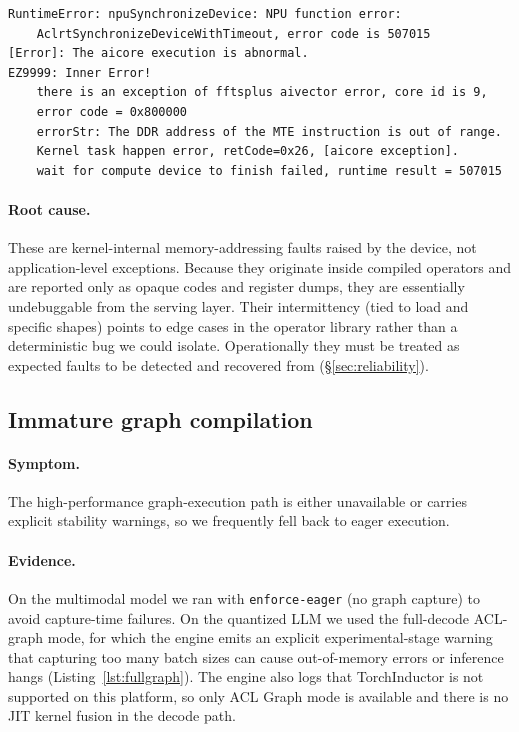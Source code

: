 \documentclass{article}
\newcommand{\code}[1]{\texttt{#1}}
\begin{document}
\begin{lstlisting}[caption={Aicore execution fault (runtime result 507015).},label={lst:aic}]
RuntimeError: npuSynchronizeDevice: NPU function error:
    AclrtSynchronizeDeviceWithTimeout, error code is 507015
[Error]: The aicore execution is abnormal.
EZ9999: Inner Error!
    there is an exception of fftsplus aivector error, core id is 9,
    error code = 0x800000
    errorStr: The DDR address of the MTE instruction is out of range.
    Kernel task happen error, retCode=0x26, [aicore exception].
    wait for compute device to finish failed, runtime result = 507015
\end{lstlisting}

\paragraph{Root cause.} These are kernel-internal memory-addressing faults raised
by the device, not application-level exceptions. Because they originate inside
compiled operators and are reported only as opaque codes and register dumps, they
are essentially undebuggable from the serving layer. Their intermittency (tied to
load and specific shapes) points to edge cases in the operator library rather than
a deterministic bug we could isolate. Operationally they must be treated as
expected faults to be detected and recovered from (\S\ref{sec:reliability}).

\subsection{Immature graph compilation}
\label{sec:graph}
\paragraph{Symptom.} The high-performance graph-execution path is either
unavailable or carries explicit stability warnings, so we frequently fell back to
eager execution.

\paragraph{Evidence.} On the multimodal model we ran with \code{enforce-eager} (no
graph capture) to avoid capture-time failures. On the quantized LLM we used the
full-decode ACL-graph mode, for which the engine emits an explicit
experimental-stage warning that capturing too many batch sizes can cause
out-of-memory errors or inference hangs (Listing~\ref{lst:fullgraph}). The engine
also logs that TorchInductor is not supported on this platform, so only ACL Graph
mode is available and there is no JIT kernel fusion in the decode path.
\end{document}
